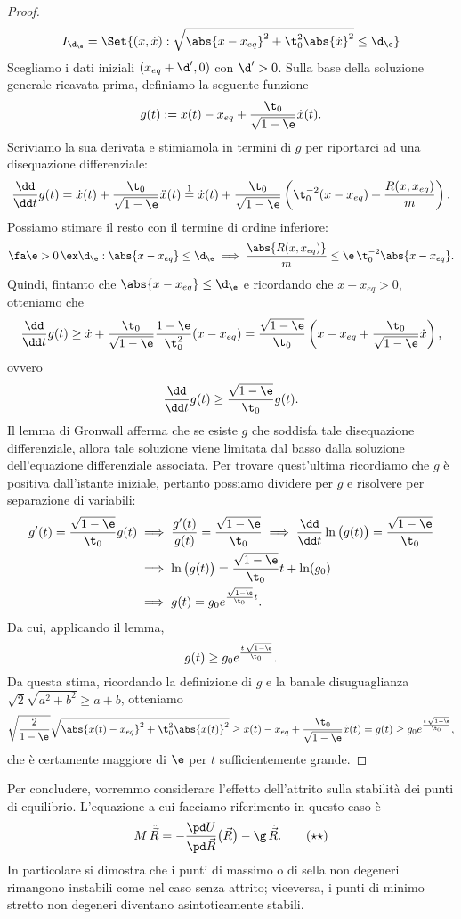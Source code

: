 \begin{proof}
	\[
		I_{\d_\e} = \Set{(x,\dot{x}): \sqrt{\abs{x-x_{eq}}^2+\t_0^2 \abs{\dot{x}}^2} \le \d_\e}
	\]
	Scegliamo i dati iniziali \((x_{eq}+\d',0)\) con \(\d'>0\). Sulla base della soluzione generale ricavata prima, definiamo la seguente funzione
	\[
		g(t) := x(t)-x_{eq} + \frac{\t_0}{\sqrt{1-\e}}\dot{x}(t).
	\]
	Scriviamo la sua derivata e stimiamola in termini di \(g\) per riportarci ad una disequazione differenziale:
	\[
		\frac{\dd}{\dd t}g(t) = \dot{x}(t) + \frac{\t_0}{\sqrt{1-\e}}\ddot{x}(t) \overset{1}{=} \dot{x}(t) + \frac{\t_0}{\sqrt{1-\e}} \left( \t_0^{-2}(x-x_{eq}) + \frac{R(x,x_{eq})}{m} \right).
	\]
	Possiamo stimare il resto con il termine di ordine inferiore:
	\[
		\fa \e >0\,\ex \d_\e: \abs{x-x_{eq}} \le \d_\e \implies \frac{\abs{R(x,x_{eq})}}{m} \le \e\,\t_0^{-2}\abs{x-x_{eq}}.
	\]
	Quindi, fintanto che \(\abs{x-x_{eq}} \le \d_\e\) e ricordando che \(x-x_{eq} > 0\), otteniamo che
	\[
		\frac{\dd}{\dd t}g(t) \ge \dot{x} + \frac{\t_0}{\sqrt{1-\e}}\frac{1-\e}{\t_0^2}(x-x_{eq}) = \frac{\sqrt{1-\e}}{\t_0} \left( x-x_{eq}+ \frac{\t_0}{\sqrt{1-\e}}\dot{x} \right),
	\]
	ovvero
	\[
		\frac{\dd}{\dd t}g(t) \ge \frac{\sqrt{1-\e}}{\t_0}g(t).
	\]
	Il lemma di Gronwall afferma che se esiste \(g\) che soddisfa tale disequazione differenziale, allora tale soluzione viene limitata dal basso dalla soluzione dell'equazione differenziale associata.
	Per trovare quest'ultima ricordiamo che \(g\) è positiva dall'istante iniziale, pertanto possiamo dividere per \(g\) e risolvere per separazione di variabili:
	\[
		\begin{split}
			g'(t) = \frac{\sqrt{1-\e}}{\t_0}g(t) & \implies \frac{g'(t)}{g(t)} = \frac{\sqrt{1-\e}}{\t_0} \implies \frac{\dd}{\dd t}\ln\big(g(t)\big) = \frac{\sqrt{1-\e}}{\t_0}\\
			& \implies \ln\big(g(t)\big) = \frac{\sqrt{1-\e}}{\t_0}t + \ln(g_0)\\
			& \implies g(t) = g_0 e^{\frac{\sqrt{1-\e}}{\t_0}t}.
		\end{split}
	\]
	Da cui, applicando il lemma,
	\[
		g(t) \ge g_0 e^{\frac{t\,\sqrt{1-\e}}{\t_0}}.
	\]
	Da questa stima, ricordando la definizione di \(g\) e la banale disuguaglianza \(\sqrt{2}\sqrt{a^2+b^2} \ge a+b\), otteniamo
	\[
		\sqrt{\frac{2}{1-\e}}\sqrt{\abs{x(t)-x_{eq}}^2+\t_0^2\abs{x(t)}^2} \ge x(t)-x_{eq} + \frac{\t_0}{\sqrt{1-\e}}\dot{x}(t) = g(t) \ge g_0 e^{\frac{t\,\sqrt{1-\e}}{\t_0}},
	\]
	che è certamente maggiore di \(\e\) per \(t\) sufficientemente grande.
\end{proof}

Per concludere, vorremmo considerare l'effetto dell'attrito sulla stabilità dei punti di equilibrio.
L'equazione a cui facciamo riferimento in questo caso è
\[
	M\,\ddot{\vec{R}} = -\frac{\pd U}{\pd \vec{R}}\big(\vec{R}\big) - \g\,\dot{\vec{R}}.\tag{\(\star\star\)}
\]
In particolare si dimostra che i punti di massimo o di sella non degeneri rimangono instabili come nel caso senza attrito; viceversa, i punti di minimo stretto non degeneri diventano asintoticamente stabili.


